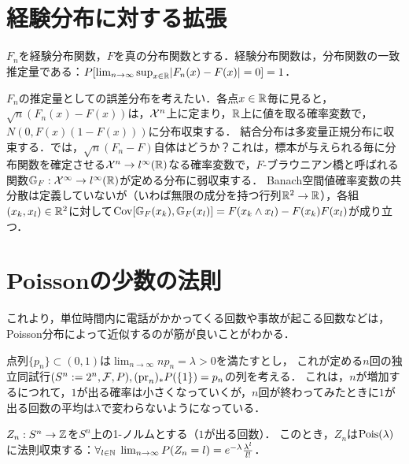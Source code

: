 \documentclass[uplatex,dvipdfmx]{jsreport}
\begin{document}
\section{経験分布に対する拡張}

\begin{theorem}
    $F_n$を経験分布関数，$F$を真の分布関数とする．経験分布関数は，分布関数の一致推定量である：$P[\lim_{n\to\infty}\sup_{x\in\mathbb{R}}\lvert F_n(x)-F(x)\rvert=0]=1$．
\end{theorem}

\begin{discussion}
    $F_n$の推定量としての誤差分布を考えたい．各点$x\in\mathbb{R}$毎に見ると，$\sqrt{n}(F_n(x)-F(x))$は，$\mathcal{X}^n$上に定まり，$\mathbb{R}$上に値を取る確率変数で，$N(0,F(x)(1-F(x)))$に分布収束する．
    結合分布は多変量正規分布に収束する．では，$\sqrt{n}(F_n-F)$自体はどうか？これは，標本が与えられる毎に分布関数を確定させる$\mathcal{X}^n\to l^\infty(\mathbb{R})$なる確率変数で，$F$-ブラウニアン橋と呼ばれる関数$\mathbb{G}_F:\mathcal{X}^\infty\to l^\infty(\mathbb{R})$が定める分布に弱収束する．
    Banach空間値確率変数の共分散は定義していないが（いわば無限の成分を持つ行列$\mathbb{R}^2\to\mathbb{R}$），各組$(x_k,x_l)\in\mathbb{R}^2$に対して$\mathrm{Cov}[\mathbb{G}_F(x_k),\mathbb{G}_F(x_l)]=F(x_k\land x_l)-F(x_k)F(x_l)$が成り立つ．
\end{discussion}

\section{Poissonの少数の法則}

\begin{notation}
    これより，単位時間内に電話がかかってくる回数や事故が起こる回数などは，Poisson分布によって近似するのが筋が良いことがわかる．
\end{notation}

\begin{notation}
    点列$\{p_n\}\subset(0,1)$は$\lim_{n\to\infty}np_n=\lambda>0$を満たすとし，
    これが定める$n$回の独立同試行$(S^n:=2^n,\mathcal{F},P),(\mathrm{pr}_n)_*P(\{1\})=p_n$の列を考える．
    これは，$n$が増加するにつれて，$1$が出る確率は小さくなっていくが，$n$回が終わってみたときに$1$が出る回数の平均は$\lambda$で変わらないようになっている．
\end{notation}

\begin{theorem}
    $Z_n:S^n\to\mathbb{Z}$を$S^n$上の1-ノルムとする（$1$が出る回数）．
    このとき，$Z_n$は$\mathrm{Pois}(\lambda)$に法則収束する：$\forall_{l\in\mathbb{N}}\;\lim_{n\to\infty}P(Z_n=l)=e^{-\lambda}\frac{\lambda^l}{l!}$．
\end{theorem}
\end{document}
